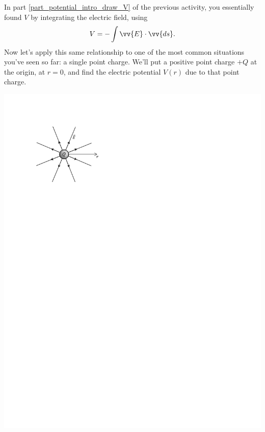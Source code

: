 In part \ref{part_potential_intro_draw_V} of the previous activity, you essentially found $V$ by integrating the electric field, using
$$V=-\int{\vv{E} \cdot \vv{ds}}.$$
Now let's apply this same relationship to one of the most common situations you've seen so far: a single point charge.  We'll put a positive point charge $+Q$ at the origin, at $r=0$, and find the electric potential $V(r)$ due to that point charge.
\begin{center}
\vspace{-0.1 in}
\includegraphics{potential_intro/activity_6_figs/point_charge_E_field_axis.pdf}
\end{center}

